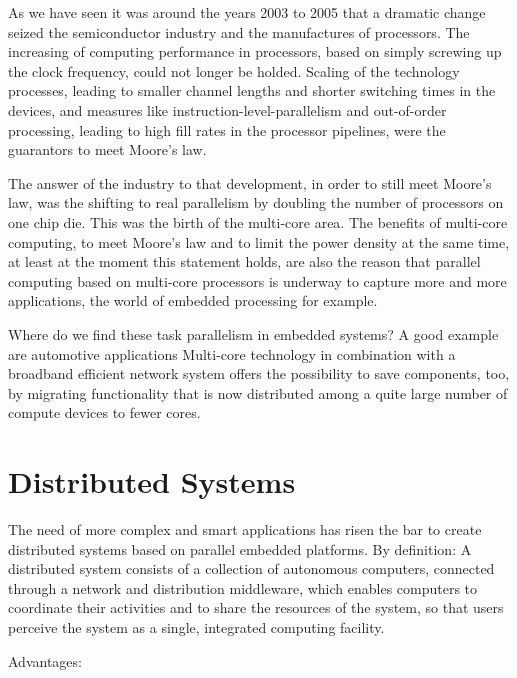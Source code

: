 As we have seen it was around the years 2003 to 2005 that a dramatic change
seized the semiconductor industry and the manufactures of processors. The
increasing of computing performance in processors, based on simply screwing up
the clock frequency, could not longer be holded. Scaling of the technology
processes, leading to smaller channel lengths and shorter switching times in
the devices, and measures like instruction-level-parallelism and out-of-order
processing, leading to high fill rates in the processor pipelines, were the
guarantors to meet Moore’s law.\cite{AMDAHL}

The answer of the industry to that development, in order to still meet Moore’s
law, was the shifting to real parallelism by doubling the number of processors
on one chip die. This was the birth of the multi-core area. The benefits of
multi-core computing, to meet Moore’s law and to limit the power density at the
same time, at least at the moment this statement holds, are also the reason
that parallel computing based on multi-core processors is underway to capture more
and more applications, the world of embedded processing for example.\cite{MATTSON}

Where do we find these task parallelism in embedded systems? A good example are
automotive applications Multi-core technology in combination with a broadband
efficient network system offers the possibility to save components, too, by
migrating functionality that is now distributed among a quite large number of
compute devices to fewer cores.


\section{Distributed Systems}
\noindent

The need of more complex and smart applications has risen the bar to create
distributed systems based on parallel embedded platforms. By definition: A
distributed system consists of a collection of autonomous computers, connected
through a network and distribution middleware, which enables computers to
coordinate their activities and to share the resources of the system, so that
users perceive the system as a single, integrated computing facility.

Advantages:

